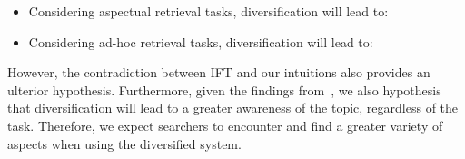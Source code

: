 \begin{itemize}
\item Considering aspectual retrieval tasks, diversification will lead to:

\vspace*{1.5mm}

\item Considering ad-hoc retrieval tasks, diversification will lead to:
\end{itemize}

However, the contradiction between IFT and our intuitions also provides an ulterior hypothesis. Furthermore, given the findings from~\cite{syed2017sal}, we also hypothesis that diversification will lead to a greater awareness of the topic, regardless of the task. Therefore, we expect searchers to encounter and find a greater variety of aspects when using the diversified system.






